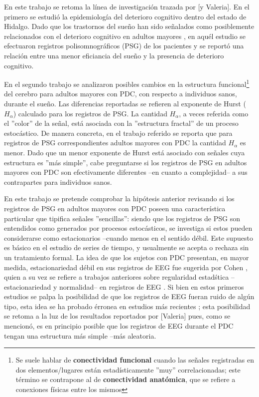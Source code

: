 \documentclass[12pt,a4paper]{mitthesis}
\begin{document}
En este trabajo se retoma la l\'inea de investigaci\'on trazada por \cite{VazquezTagle16} [y
Valeria]. 
En el primero se estudi\'o la epidemiolog\'ia del deterioro cognitivo dentro del estado de
Hidalgo. Dado que los trastornos del sue\~no han sido se\~nalados como posiblemente relacionados
con el deterioro cognitivo en adultos mayores \cite{Amer13,Miyata13,Potvin12}, en aqu\'el estudio
se efectuaron registros polisomnogr\'aficos (PSG) de los pacientes y se report\'o una relaci\'on
entre una menor eficiancia del sue\~no y la presencia de deterioro cognitivo.

En el segundo trabajo se analizaron posibles cambios en la estructura funcional\footnote{Se suele 
hablar de \textbf{conectividad funcional} cuando las se\~nales registradas en dos elementos/lugares 
est\'an estad\'isticamente ''muy'' correlacionadas; este t\'ermino se contrapone al de
\textbf{conectividad anat\'omica}, que se refiere a conexiones f\'isicas entre los mismos} del 
cerebro para adultos mayores con PDC, con respecto a individuos sanos, durante el sue\~no.
Las diferencias reportadas se refieren al exponente de Hurst ($H_\alpha$) calculado para los 
registros de PSG.
La cantidad $H_\alpha$, a veces referida como el ''color'' de la se\~nal, est\'a asociada con la
''estructura fractal'' de un proceso estoc\'astico. De manera concreta, en el trabajo referido
se reporta que para registros de PSG correspondientes adultos mayores con 
PDC la cantidad $H_\alpha$ es menor. Dado que un menor exponente de Hurst est\'a 
asociado con se\~nales cuya estructura es ''m\'as simple'', cabe preguntarse si 
los registros de PSG en adultos mayores con PDC son efectivamente diferentes --en cuanto a 
complejidad-- a sus
contrapartes para individuos sanos. 

En este trabajo se pretende comprobar la hip\'otesis anterior revisando si los registros de PSG en 
adultos mayores con PDC poseen una caracter\'istica particular que tipifica se\~nales 
''sencillas'': siendo que los registros de PSG son entendidos como generados por procesos 
estoc\'asticos, se investiga si estos pueden considerarse como estacionarios --cuando menos en el 
sentido d\'ebil.
Este supuesto es b\'asico en el estudio de series de tiempo, y usualmente se acepta o rechaza 
sin un tratamiento formal.
La idea de que los sujetos con PDC presentan, en mayor medida, estacionariedad d\'ebil en sus 
registros de EEG fue sugerida por Cohen \cite{Cohen77}, quien a su vez se refiere a trabajos 
anteriores sobre regularidad estad\'stica --estacionariedad y normalidad-- en registros de EEG \cite{McEwen75,Sugimoto78,Kawabata73}. 
Si bien en estos primeros estudios se palpa la posibilidad de que los registros de EEG fueran
ruido de alg\'un tipo, esta idea se ha probado \'erronea en estudios m\'as recientes 
\cite{Klonowski09}; esta posibilidad se retoma a la luz de los resultados reportados por
[Valeria] pues, como se mencion\'o, es en principio posible que los registros de EEG durante el 
PDC tengan una estructura m\'as simple --m\'as aleatoria.
\end{document}
